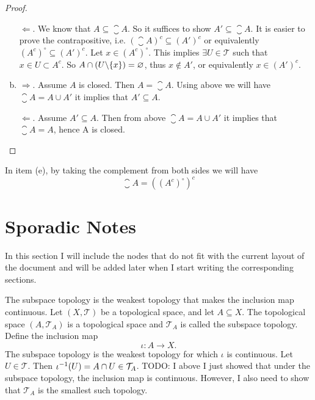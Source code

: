 \begin{proof}
\begin{enumerate}[(a)]
		\noindent $ \boxed{\Leftarrow} $. We know that $ A \subseteq \closure{A} $. So it suffices to show $ A' \subseteq \closure{A} $. It is easier to prove the contrapositive, i.e. $ (\closure{A})^c \subseteq (A')^c $ or equivalently $ (A^c)^\circ \subseteq (A')^c $. Let $ x \in (A^c)^\circ $. This implies $ \exists U \in \mathcal{T} $ such that $ x \in U \subset A^c $. So $ A \cap (U\backslash\{x\}) = \varnothing $, thus $ x \notin A' $, or equivalently $ x \in (A')^c $.
		\item \noindent $ \boxed{\Rightarrow} $. Assume $ A $ is closed. Then $ A = \closure{A} $. Using above we will have $ \closure{A} = A \cup A'  $ it implies that $ A' \subseteq A $.
		
		\noindent $ \boxed{\Leftarrow} $. Assume $ A' \subseteq A $. Then from above $ \closure{A} = A \cup A'$ it implies that $ \closure{A} = A$, hence A is closed.
	\end{enumerate}
\end{proof}
\begin{remark}
	In item (e), by taking the complement from both sides we will have
	\[ \closure{A} = ((A^c)^\circ)^c \]
\end{remark}


\section{Sporadic Notes}
In this section I will include the nodes that do not fit with the current layout of the document and will be added later when I start writing the corresponding sections. 

\begin{observation}
	The subspace topology is the weakest topology that makes the inclusion map continuous. Let $ (X,\mathcal{T}) $ be a topological space, and let $ A \subseteq X $. The topological space $ (A,\mathcal{T}_A) $ is a topological space and $ \mathcal{T}_A $ is called the subspace topology. Define the inclusion map
	\[ \iota : A \to X. \]
	The subspace topology is the weakest topology for which $ \iota  $ is continuous. Let $ U \in \mathcal{T} $. Then $ \iota^{-1}(U) = A \cap U \in \mathcal{T}_A $. {\color{red} \noindent TODO:} I above I just showed that under the subspace topology, the inclusion map is continuous. However, I also need to show that $ \mathcal{T}_A $ is the smallest such topology.
\end{observation}





